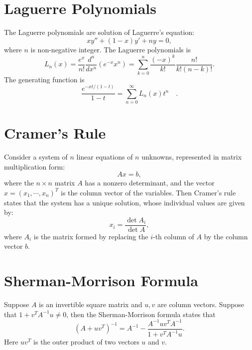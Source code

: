 \documentclass{book}
\numberwithin{equation}{section}
\begin{document}
\section{Laguerre Polynomials}
The Laguerre polynomials are solution of Laguerre's equation:
\begin{equation}
  xy''+(1-x)y'+ny=0,
\end{equation}
where $n$ is non-negative integer. The Laguerre polynomials is
\begin{equation}
  L_n(x)=\frac{e^x}{n!}\frac{d^n}{dx^n}(e^{-x}x^n)=
  \sum_{k=0}^n\frac{(-x)^k}{k!}\frac{n!}{k!(n-k)!}.
\end{equation}
The generating function is
\begin{equation}
  \frac{e^{-xt/(1-t)}}{1-t}=\sum_{n=0}^\infty L_n(x)t^n\quad.
\end{equation}

\section{Cramer's Rule}
Consider a system of $n$ linear equations of $n$ unknowns, represented in 
matrix multiplication form:
\begin{equation}
  Ax=b,
\end{equation}
where the $n\times n$ matrix $A$ has a nonzero determinant, and the
vector $x=(x_1,\cdots,x_n)^T$ is the column vector of the variables.
Then Cramer's rule states that the system has a unique solution, whose
individual values are given by:
\begin{equation}
  x_i=\frac{\det A_i}{\det A},
\end{equation}
where $A_i$ is the matrix formed by replacing the $i$-th column of $A$
by the column vector $b$.



\section{Sherman-Morrison Formula}
Suppose $A$ is an invertible square matrix and $u,v$ are column
vectors. Suppose that $1+v^TA^{-1}u\ne0$, then the Sherman-Morrison formula
states that
\begin{equation}
  (A+uv^T)^{-1}=A^{-1}-\frac{A^{-1}uv^TA^{-1}}{1+v^TA^{-1}u}.
\end{equation}
Here $uv^T$ is the outer product of two vectors $u$ and $v$.
\end{document}
